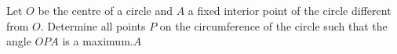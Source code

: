 Let $O$ be the centre of a circle and $A$ a fixed interior point of the circle different from $O$.  Determine all points $P$ on the circumference of the circle such that the angle $OPA$ is a maximum.$A$